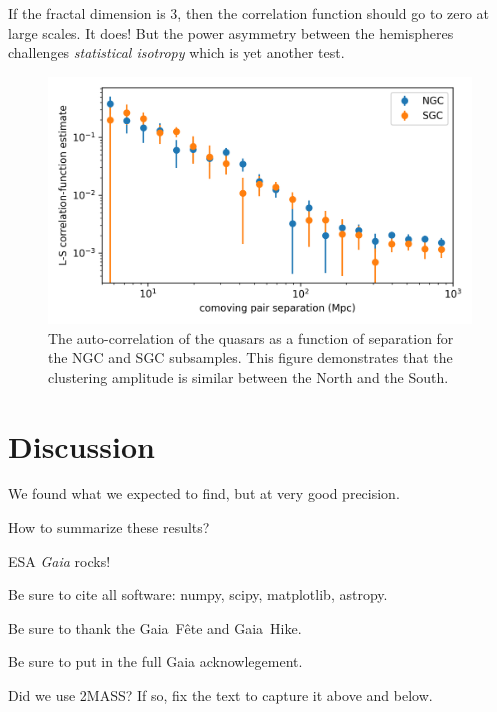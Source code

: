\documentclass[modern]{aastex631}
\newlength{\figurewidth}
\begin{document}
If the fractal dimension is 3, then the correlation function should go to zero at large scales.
It does!
But the power asymmetry between the hemispheres challenges \emph{statistical isotropy} which is yet another test.

\begin{figure}[t!]
  \begin{mdframed}
  \color{captiongray}
  \begin{center}
    \includegraphics[width=\figurewidth]{notebooks/corrfunc.png}
  \end{center}
    \caption{The auto-correlation of the quasars as a function of separation for the NGC and SGC subsamples.
    This figure demonstrates that the clustering amplitude is similar between the North and the South.\label{fig:corrfunc}}
  \end{mdframed}
\end{figure}

\section{Discussion}\label{sec:discuss}

We found what we expected to find, but at very good precision.

How to summarize these results?

ESA \textsl{Gaia} rocks!

\begin{acknowledgements}
Be sure to cite all software: numpy, scipy, matplotlib, astropy.

Be sure to thank the Gaia~F\^ete and Gaia~Hike.

Be sure to put in the full Gaia acknowlegement.

Did we use 2MASS? If so, fix the text to capture it above and below.
\end{acknowledgements}
\end{document}
